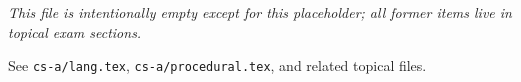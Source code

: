 


\question[1]
\textit{This file is intentionally empty except for this placeholder; all former items live in topical exam sections.}
\makeemptybox{0.25in}
\begin{solution}
  See \texttt{cs-a/lang.tex}, \texttt{cs-a/procedural.tex}, and related topical files.
\end{solution}

